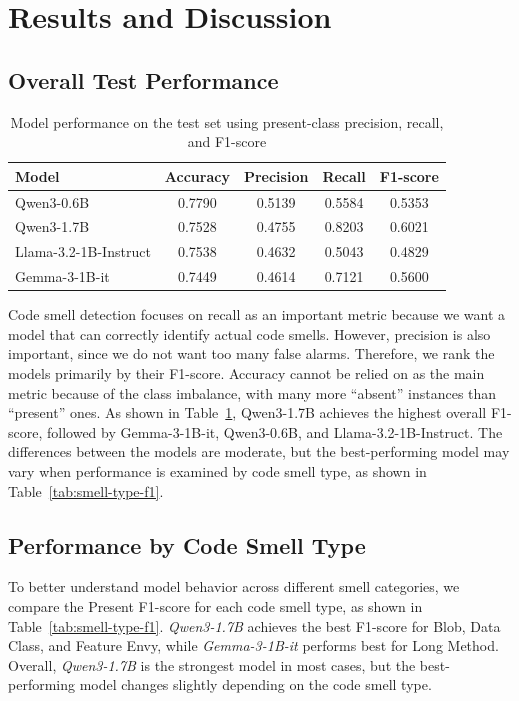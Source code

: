 \section{Results and Discussion}
\label{sec:results}

\subsection{Overall Test Performance}
\label{subsec:overall-test-performance}
\begin{table}[h!]
\centering
\caption{Model performance on the test set using present-class precision, recall, and F1-score}
\label{tab:model-performance}
\begin{tabular}{|l|c|c|c|c|}
\hline
\textbf{Model} & \textbf{Accuracy} & \textbf{Precision} & \textbf{Recall} & \textbf{F1-score} \\
\hline
Qwen3-0.6B & 0.7790 & 0.5139 & 0.5584 & 0.5353 \\
\hline
Qwen3-1.7B & 0.7528 & 0.4755 & 0.8203 & 0.6021 \\
\hline
Llama-3.2-1B-Instruct & 0.7538 & 0.4632 & 0.5043 & 0.4829 \\
\hline
Gemma-3-1B-it & 0.7449 & 0.4614 & 0.7121 & 0.5600 \\
\hline
\end{tabular}
\end{table}
Code smell detection focuses on recall as an important metric because we want a model that can correctly identify actual code smells. However, precision is also important, since we do not want too many false alarms. Therefore, we rank the models primarily by their F1-score.
Accuracy cannot be relied on as the main metric because of the class imbalance, with many more ``absent'' instances than ``present'' ones.
As shown in Table~\ref{tab:model-performance}, Qwen3-1.7B achieves the highest overall F1-score, followed by Gemma-3-1B-it, Qwen3-0.6B, and Llama-3.2-1B-Instruct.
The differences between the models are moderate, but the best-performing model may vary when performance is examined by code smell type, as shown in Table~\ref{tab:smell-type-f1}.

\subsection{Performance by Code Smell Type}
\label{subsec:performance-by-smell}
To better understand model behavior across different smell categories, we compare the Present F1-score for each code smell type, as shown in Table~\ref{tab:smell-type-f1}.
\textit{Qwen3-1.7B} achieves the best F1-score for Blob, Data Class, and Feature Envy, while \textit{Gemma-3-1B-it} performs best for Long Method. Overall, \textit{Qwen3-1.7B} is the strongest model in most cases, but the best-performing model changes slightly depending on the code smell type.

